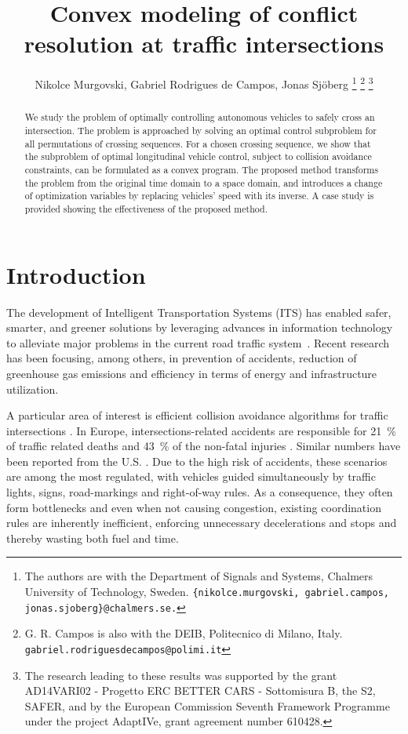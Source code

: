 \documentclass[letterpaper,10pt,conference]{ieeeconf}
\author{Nikolce Murgovski, Gabriel Rodrigues de Campos, Jonas Sj\"oberg
\thanks{The authors are with the Department of Signals and Systems, Chalmers University of Technology, Sweden. {\tt \{nikolce.murgovski, gabriel.campos, jonas.sjoberg\}@chalmers.se.}}%
\thanks{G. R. Campos is also with the DEIB, Politecnico di Milano, Italy. {\tt gabriel.rodriguesdecampos@polimi.it}}%
\thanks{The research leading to these results was supported by the grant AD14VARI02 - Progetto ERC BETTER CARS - Sottomisura B, the S2, SAFER, and by the European Commission Seventh Framework Programme under the project AdaptIVe, grant agreement number 610428.}%
}
\begin{document}
\title{Convex modeling of conflict resolution at traffic intersections}

\maketitle
\thispagestyle{empty}
\pagestyle{empty}


\begin{abstract}
We study the problem of optimally controlling autonomous vehicles to safely cross an intersection. The problem is approached by solving an optimal control subproblem for all permutations of crossing sequences. For a chosen crossing sequence, we show that the subproblem of optimal longitudinal vehicle control, subject to collision avoidance constraints, can be formulated as a convex program. The proposed method transforms the problem from the original time domain to a space domain, and introduces a change of optimization variables by replacing vehicles' speed with its inverse. A case study is provided showing the effectiveness of the proposed method.
\end{abstract}


\section{Introduction}


The development of Intelligent Transportation Systems (ITS) has enabled safer, smarter, and greener solutions  by leveraging advances in information technology to alleviate major problems in the current road traffic system~\cite{Behere2013}. Recent research has been focusing, among others, in prevention of accidents, reduction of greenhouse gas emissions and efficiency in terms of energy and infrastructure utilization.

A particular area of interest is efficient collision avoidance algorithms for traffic intersections \cite{Hafner2013,Doerzaph08a,Alexander11a}. In Europe,  intersections-related accidents are responsible for \SI{21}{\%} of traffic related deaths and \SI{43}{\%} of the non-fatal injuries \cite{Simon2009}. Similar numbers have been reported from the U.S. \cite{nhtsa2}. Due to the high risk of accidents, these scenarios are among the most regulated, with vehicles guided simultaneously by traffic lights, signs, road-markings and right-of-way rules. As a consequence, they often form bottlenecks and even when not causing congestion, existing coordination rules are inherently inefficient, enforcing unnecessary decelerations and stops and thereby wasting both fuel and time.
\end{document}
